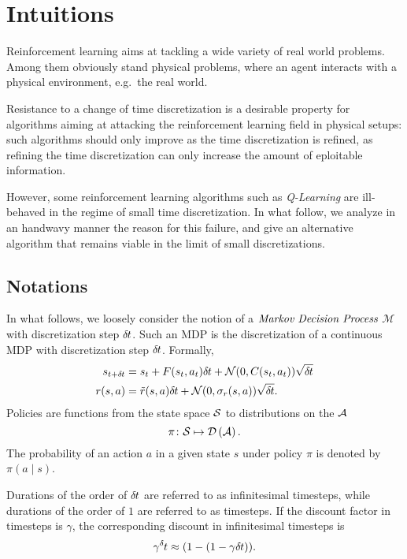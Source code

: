 
\section{Intuitions}
\label{sec:intuitions}
Reinforcement learning aims at tackling a wide variety of real world problems.
Among them obviously stand physical problems, where an agent interacts with a
physical environment, e.g.\ the real world.

Resistance to a change of time discretization is a desirable property for
algorithms aiming at attacking the reinforcement learning field in physical
setups: such algorithms should only improve as the time discretization is
refined, as refining the time discretization can only increase the amount of 
eploitable information.

However, some reinforcement learning algorithms such as \emph{Q-Learning} are
ill-behaved in the regime of small time discretization. In what follow, we
analyze in an handwavy manner the reason for this failure, and give an alternative
algorithm that remains viable in the limit of small discretizations.


\subsection{Notations}
In what follows, we loosely consider the notion of a $\emph{Markov Decision Process}$
$\mathcal{M}$ with discretization step $\delta\hspace{-.06em}t$. Such an MDP is the discretization
of a continuous MDP with discretization step $\delta\hspace{-.06em}t$.
Formally,
\begin{align}
	s_{t + \delta\hspace{-.06em}t} &= s_t + F(s_t, a_t) \delta\hspace{-.06em}t + \mathcal{N}(0, C(s_t, a_t)) \sqrt{\delta\hspace{-.06em}t}\\
	r(s, a) &= \tilde{r}(s, a) \delta\hspace{-.06em}t + \mathcal{N}(0, \sigma_r(s, a)) \sqrt{\delta\hspace{-.06em}t}.
\end{align}
Policies are functions from the state space $\mathcal{S}$ to distributions on the
$\mathcal{A}$
\begin{equation}
	\pi\colon \mathcal{S} \mapsto \mathcal{D}\left(\mathcal{A}\right).
\end{equation}
The probability of an action $a$ in a given state $s$ under policy $\pi$ is
denoted by $\pi\left(a\mid s\right)$.

Durations of the order of $\delta\hspace{-.06em}t$ are referred to as infinitesimal
timesteps, while durations of the order of $1$ are referred to as timesteps.
If the discount factor in timesteps is $\gamma$, the corresponding
discount in infinitesimal timesteps is
\begin{equation}
	\gamma^\deltat \approx (1 - (1 - \gamma \deltat)).
\end{equation}

